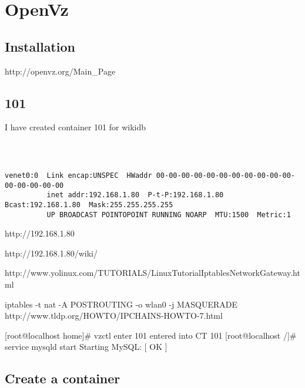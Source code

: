 \chapter{OpenVz}
\section{Installation}
http://openvz.org/Main_Page
\section{101}
I have created container 101 for wikidb
\begin{verbatim}
 


venet0:0  Link encap:UNSPEC  HWaddr 00-00-00-00-00-00-00-00-00-00-00-00-00-00-00-00
          inet addr:192.168.1.80  P-t-P:192.168.1.80  Bcast:192.168.1.80  Mask:255.255.255.255
          UP BROADCAST POINTOPOINT RUNNING NOARP  MTU:1500  Metric:1
\end{verbatim}

http://192.168.1.80

http://192.168.1.80/wiki/

http://www.yolinux.com/TUTORIALS/LinuxTutorialIptablesNetworkGateway.html

iptables -t nat -A POSTROUTING -o wlan0 -j MASQUERADE
http://www.tldp.org/HOWTO/IPCHAINS-HOWTO-7.html

[root@localhost home]# vzctl enter 101
entered into CT 101
[root@localhost /]# service mysqld start
Starting MySQL:                                            [  OK  ]




\section{Create a container}
\begin{verbatim}
 

\end{verbatim}


